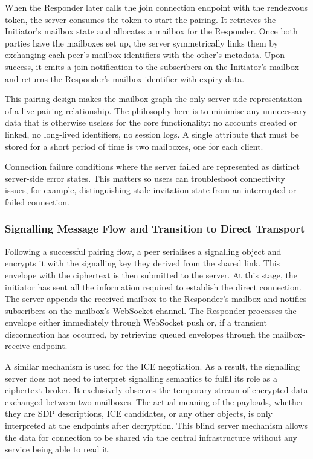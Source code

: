 \documentclass[12pt,a4paper]{article}
\begin{document}
When the Responder later calls the join connection endpoint with the rendezvous token, the server consumes the token to start the pairing. It retrieves the Initiator’s mailbox state and allocates a mailbox for the Responder. Once both parties have the mailboxes set up, the server symmetrically links them by exchanging each peer’s mailbox identifiers with the other’s metadata. Upon success, it emits a join notification to the subscribers on the Initiator’s mailbox and returns the Responder’s mailbox identifier with expiry data.

This pairing design makes the mailbox graph the only server-side representation of a live pairing relationship. The philosophy here is to minimise any unnecessary data that is otherwise useless for the core functionality: no accounts created or linked, no long-lived identifiers, no session logs. A single attribute that must be stored for a short period of time is two mailboxes, one for each client.

Connection failure conditions where the server failed are represented as distinct server-side error states. This matters so users can troubleshoot connectivity issues, for example, distinguishing stale invitation state from an interrupted or failed connection.

\subsubsection{Signalling Message Flow and Transition to Direct Transport}

Following a successful pairing flow, a peer serialises a signalling object and encrypts it with the signalling key they derived from the shared link. This envelope with the ciphertext is then submitted to the server. At this stage, the initiator has sent all the information required to establish the direct connection. The server appends the received mailbox to the Responder’s mailbox and notifies subscribers on the mailbox’s WebSocket channel. The Responder processes the envelope either immediately through WebSocket push or, if a transient disconnection has occurred, by retrieving queued envelopes through the mailbox-receive endpoint.

A similar mechanism is used for the ICE negotiation. As a result, the signalling server does not need to interpret signalling semantics to fulfil its role as a ciphertext broker. It exclusively observes the temporary stream of encrypted data exchanged between two mailboxes. The actual meaning of the payloads, whether they are SDP descriptions, ICE candidates, or any other objects, is only interpreted at the endpoints after decryption. This blind server mechanism allows the data for connection to be shared via the central infrastructure without any service being able to read it.
\end{document}

